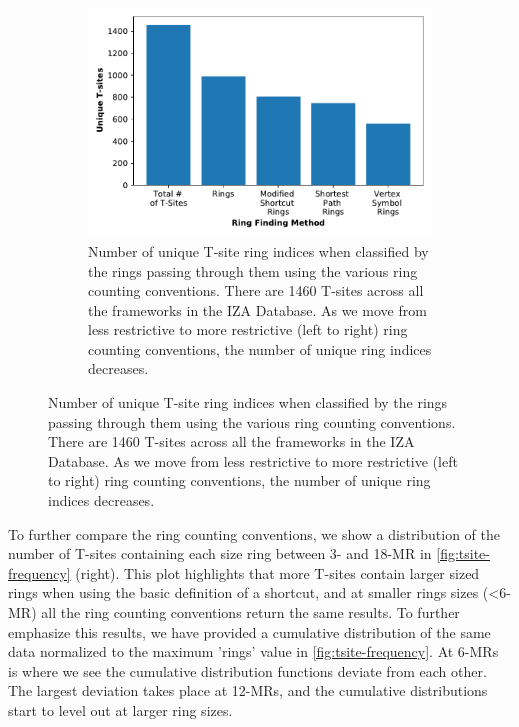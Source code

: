 \documentclass[11pt]{article}
\begin{document}
\begin{figure}
\begin{figure}[H]
\centering
\includegraphics[width=\textwidth]{figures/chapter-3/unique-ts.pdf}
\caption{Number of unique T-site ring indices when classified by the rings passing through them using the various ring counting conventions. There are 1460 T-sites across all the frameworks in the IZA Database. As we move from less restrictive to more restrictive (left to right) ring counting conventions, the number of unique ring indices decreases. \label{fig:unique-ts}}
\end{figure}
\end{figure}

To further compare the ring counting conventions, we show a distribution of the number of T-sites containing each size ring between 3- and 18-MR in \cref{fig:tsite-frequency} (right). This plot highlights that more T-sites contain larger sized rings when using the basic definition of a shortcut, and at smaller rings sizes (\textless6-MR) all the ring counting conventions return the same results.  To further emphasize this results, we have provided a cumulative distribution of the same data normalized to the maximum 'rings' value in \cref{fig:tsite-frequency}. At 6-MRs is where we see the cumulative distribution functions deviate from each other. The largest deviation takes place at 12-MRs, and the cumulative distributions start to level out at larger ring sizes. 
\end{document}
